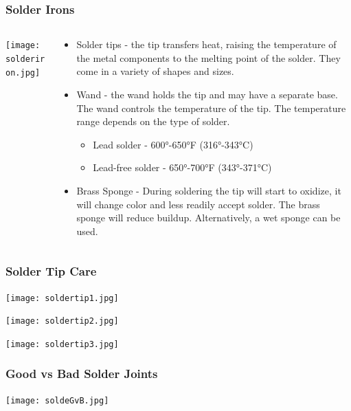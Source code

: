 \documentclass{beamer}
\begin{document}
\begin{frame}\frametitle{Solder Irons}
\begin{columns}
\begin{column}{4cm}
\begin{center}
\texttt{[image: solderiron.jpg]}
\end{center}
\end{column}
\begin{column}{8cm}
\begin{itemize}
\item Solder tips - the tip transfers heat, raising the temperature of the metal components to the melting point of the solder. They come in a variety of shapes and sizes.
\item Wand - the wand holds the tip and may have a separate base. The wand controls the temperature of the tip. The temperature range depends on the type of solder.
	\begin{itemize}
	\item Lead solder - 600°-650°F (316°-343°C)
	\item Lead-free solder - 650°-700°F (343°-371°C)
	\end{itemize}
\item Brass Sponge - During soldering the tip will start to oxidize, it will change color and less readily accept solder. The brass sponge will reduce buildup. Alternatively, a wet sponge can be used.
\end{itemize}
\end{column}
\end{columns}
\end{frame}

\begin{frame}\frametitle{Solder Tip Care}

\begin{center}
\texttt{[image: soldertip1.jpg]}

\texttt{[image: soldertip2.jpg]}

\texttt{[image: soldertip3.jpg]}
\end{center}

\end{frame}

\begin{frame}\frametitle{Good vs Bad Solder Joints}
\begin{center}
\texttt{[image: soldeGvB.jpg]}
\end{center}
\end{frame}
\end{document}
